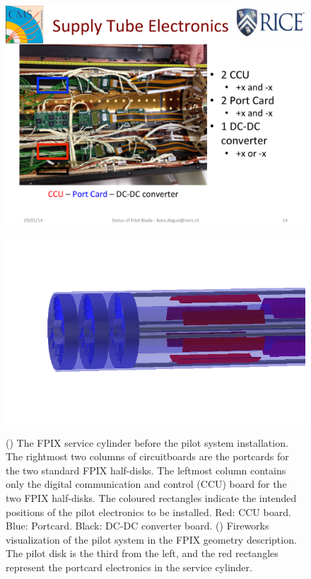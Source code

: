 \begin{figure}[hbtp]
  \begin{center}
    \includegraphics[width=1.24\cmsFigWidth]{figures/pilotelectronics_actual}
    \includegraphics[width=1.24\cmsFigWidth]{figures/PilotGeom_8PortCards2}
    \caption{(\cmsLeft) The FPIX service cylinder before the pilot system installation. The rightmost two columns of circuitboards are the portcards for the two standard FPIX half-disks. The leftmost column contains only the digital communication and control (CCU) board for the two FPIX half-disks. The coloured rectangles indicate the intended positions of the pilot electronics to be installed. Red: CCU board. Blue: Portcard. Black: DC-DC converter board. (\cmsRight) Fireworks visualization of the pilot system in the FPIX geometry description. The pilot disk is the third from the left, and the red rectangles represent the portcard electronics in the service cylinder.}
    \label{fig:pilotelectronics}
  \end{center}
\end{figure}


